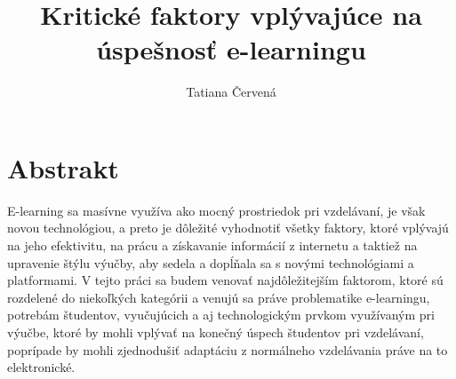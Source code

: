 \documentclass[12pt]{article}
\title{Kritické faktory vplývajúce na úspešnosť e-learningu}
\author{Tatiana Červená}
\begin{document}
\maketitle
\section{Abstrakt}
E-learning sa masívne využíva ako mocný prostriedok pri vzdelávaní, je však novou technológiou, a preto je dôležité vyhodnotiť všetky faktory, ktoré vplývajú na jeho efektivitu, na prácu a získavanie informácií z internetu a taktiež na upravenie štýlu výučby, aby sedela a dopĺňala sa s novými technológiami a platformami. V tejto práci sa budem venovať najdôležitejším faktorom, ktoré sú rozdelené do niekoľkých kategórii a venujú sa práve problematike e-learningu, potrebám študentov, vyučujúcich a aj technologickým prvkom využívaným pri výučbe, ktoré by mohli vplývať na konečný úspech študentov pri vzdelávaní, poprípade by mohli zjednodušiť adaptáciu z normálneho vzdelávania práve na to elektronické.
\end{document}
